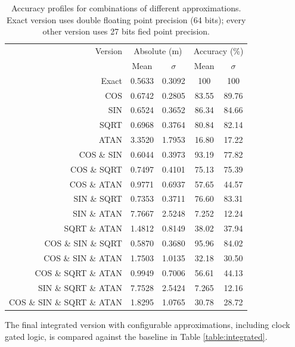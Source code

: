 \begin{table}[h]
\begin{tabular}{r c c c c}
\toprule
Version & \multicolumn{2}{c}{Absolute (m)} & \multicolumn{2}{c}{Accuracy (\%)}\\
 & Mean & $\sigma$ & Mean & $\sigma$\\
\hline
Exact	& 0.5633 & 0.3092 & 100 & 100\\
\hline
COS & 						0.6742	& 0.2805	& 83.55 & 89.76 \\
SIN & 						0.6524	& 0.3652	& 86.34 & 84.66 \\
SQRT & 						0.6968	& 0.3764	& 80.84 & 82.14 \\
ATAN & 						3.3520	& 1.7953	& 16.80 & 17.22 \\
COS \& SIN & 				0.6044	& 0.3973	& 93.19 & 77.82 \\
COS \& SQRT& 				0.7497	& 0.4101	& 75.13 & 75.39 \\
COS \& ATAN & 				0.9771	& 0.6937	& 57.65 & 44.57 \\
SIN \& SQRT & 				0.7353	& 0.3711	& 76.60 & 83.31 \\
SIN \& ATAN & 				7.7667	& 2.5248	& 7.252 & 12.24 \\
SQRT \& ATAN & 				1.4812	& 0.8149	& 38.02 & 37.94 \\
COS \& SIN \& SQRT & 		0.5870	& 0.3680	& 95.96 & 84.02 \\
COS \& SIN \& ATAN& 		1.7503	& 1.0135	& 32.18 & 30.50 \\
COS \& SQRT \& ATAN& 		0.9949	& 0.7006	& 56.61 & 44.13 \\
SIN \& SQRT \& ATAN  & 		7.7528	& 2.5424	& 7.265 & 12.16 \\
COS \& SIN \& SQRT \& ATAN &1.8295 	& 1.0765	& 30.78 & 28.72 \\
\hline
\end{tabular}
\caption{Accuracy profiles for combinations of different approximations. Exact version uses double floating point precision (64 bits); every other version uses 27 bits fied point precision.}
\label{table:acc_profiles}
\end{table}

\par The final integrated version with configurable approximations, including clock gated logic, is compared against the baseline in Table \ref{table:integrated}.

